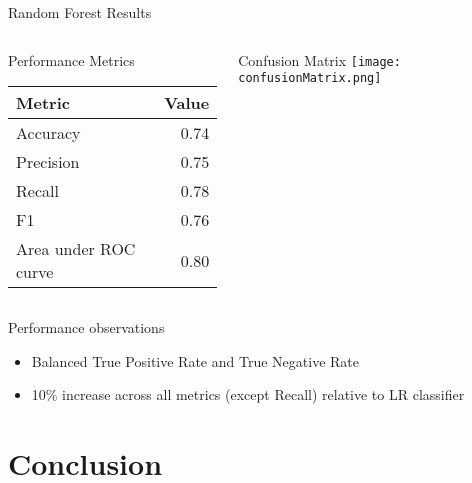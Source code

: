 \documentclass{beamer}
\begin{document}
\begin{frame}{Random Forest Results}
	\begin{columns}
		\column[T]{6cm}
		\begin{block}{Performance Metrics}
			\begin{tabular}{lr}
				\textbf{Metric} & \textbf{Value} \\
				\hline
				Accuracy &  0.74 \\
				Precision & 0.75 \\
				Recall & 0.78 \\
				F1 & 0.76 \\
				Area under ROC curve & 0.80 \\	
			\end{tabular}
		\end{block}
		
		\column[T]{4cm}
		\begin{block}{Confusion Matrix}
			\centering
			\texttt{[image: confusionMatrix.png]}
		\end{block}	
		
	\end{columns}
	
	\begin{block}{Performance observations}
		\begin{itemize}
			\item Balanced True Positive Rate and True Negative Rate
			\item 10\% increase across all metrics (except Recall) relative to LR classifier
		\end{itemize}
		
	\end{block}	
	

	
\end{frame}




\section{Conclusion}
\end{document}
